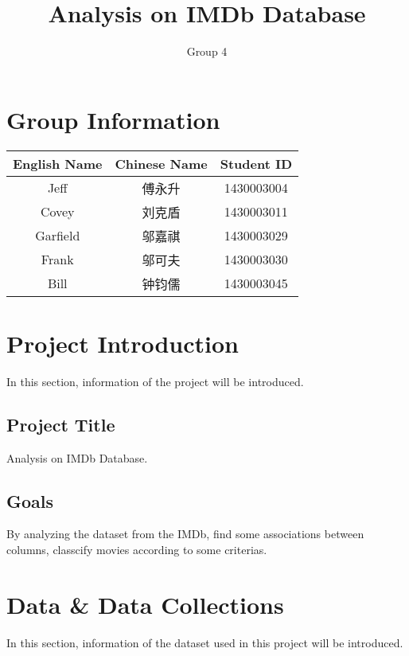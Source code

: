 \documentclass[10pt]{article}
\author{Group 4}
\title{Analysis on IMDb Database}
\begin{document}
    \begin{CJK}{UTF8}{gbsn}
        \maketitle
        \tableofcontents
        \section{Group Information}
        \begin{tabular} {|c|c|c|}
            \hline
            English Name & Chinese Name & Student ID \\
            \hline
            Jeff & 傅永升 & 1430003004 \\
            \hline
            Covey & 刘克盾 & 1430003011 \\
            \hline
            Garfield & 邬嘉祺 & 1430003029 \\
            \hline
            Frank & 邬可夫 & 1430003030 \\
            \hline
            Bill & 钟钧儒 & 1430003045 \\
            \hline
        \end{tabular}
        \section{Project Introduction}
        In this section, information of the project will be introduced.
            \subsection{Project Title}
            Analysis on IMDb Database.
            \subsection{Goals}
            By analyzing the dataset from the IMDb, find some associations between columns, classcify movies according to some criterias.
        \section{Data \& Data Collections}
        In this section, information of the dataset used in this project will be introduced.

\end{CJK}
\end{document}
